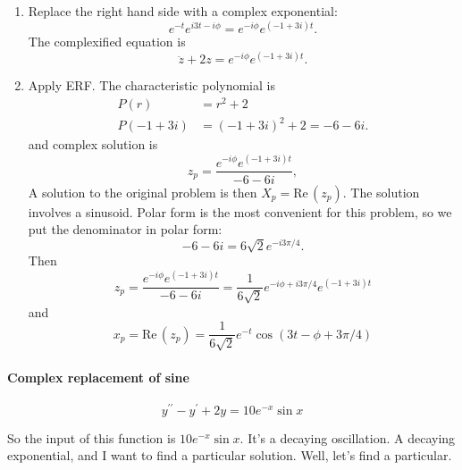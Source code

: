 \Solution
\begin{enumerate}
\item Replace the right hand side with a complex exponential:
  \begin{equation*}
    \displaystyle e^{-t}e^{i3t -i\phi}
    \displaystyle = e^{-i\phi}e^{(-1 + 3i)t}.
  \end{equation*}
  The complexified equation is
  \begin{equation*}
    \ddot{z} + 2z = e^{-i\phi}e^{(-1 + 3i)t}.
  \end{equation*}
\item Apply ERF. The characteristic polynomial is
  \begin{align*}
    P(r) &= r^2 + 2 \\
    P(-1 + 3i) &= (-1 + 3i)^2 + 2 = -6 -6i.     
  \end{align*}
  and complex solution is
  \begin{equation*}
    \displaystyle z_ p
    \displaystyle = \frac{e^{-i\phi}e^{(-1 + 3i)t}}{-6 -6i}, 
  \end{equation*}
  A solution to the original problem is then $X_ p = \mathrm{Re\, } (z_ p)$.
  The solution involves a sinusoid. Polar form is the most convenient for
  this problem, so we put the denominator in polar form:
  \begin{equation*}
    -6 -6i = 6 \sqrt{2} e^{-i 3 \pi / 4}. 
  \end{equation*}
  Then
  \begin{equation*}
    \displaystyle z_ p
    \displaystyle = \frac{e^{-i\phi}e^{(-1 + 3i)t}}{-6 -6i}
    \displaystyle = \frac{1}{6 \sqrt{2}} e^{-i\phi + i 3 \pi / 4}e^{(-1 + 3i)t} 
  \end{equation*}
  and
  \begin{equation*}
    \displaystyle x_ p
    \displaystyle = \mathrm{Re\, } (z_ p)
    \displaystyle = \frac{1}{6 \sqrt{2}} e^{-t} \cos (3t - \phi + 3 \pi / 4)
  \end{equation*}
\end{enumerate}

\paragraph{Complex replacement of sine}

\begin{equation*}
  y^{\prime \prime} - y^{\prime} + 2y = 10e^{-x} \sin x 
\end{equation*}

So the input of this function is $10e^{-x} \sin x $. 
It's a decaying oscillation.
A decaying exponential, and I want to find a particular solution.
Well, let's find a particular. \\

